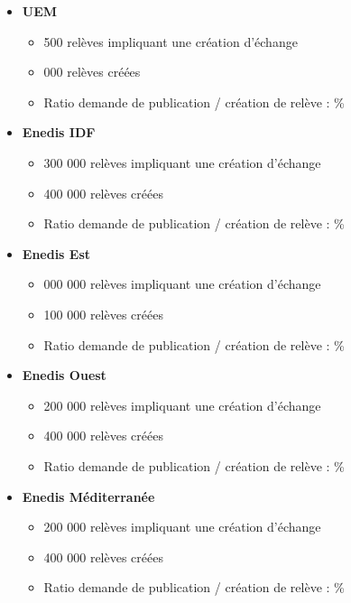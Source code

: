 \documentclass[a4paper, 12pt]{report}
\begin{document}
\begin{itemize}
  \item \textbf{UEM}
  \begin{itemize}
    \item \approx{} 500 relèves impliquant une création d'échange
    \item \approx{} 000 relèves créées
    \item Ratio demande de publication / création de relève : \approx{}\%
  \end{itemize}
  \item \textbf{Enedis IDF}
  \begin{itemize}
    \item \approx{} 300 000 relèves impliquant une création d'échange
    \item \approx{} 400 000 relèves créées
    \item Ratio demande de publication / création de relève : \approx{}\%
  \end{itemize}
  \item \textbf{Enedis Est}
  \begin{itemize}
    \item \approx{} 000 000 relèves impliquant une création d'échange
    \item \approx{} 100 000 relèves créées
    \item Ratio demande de publication / création de relève : \approx{}\%
  \end{itemize}
  \item \textbf{Enedis Ouest}
  \begin{itemize}
    \item \approx{} 200 000 relèves impliquant une création d'échange
    \item \approx{} 400 000 relèves créées
    \item Ratio demande de publication / création de relève : \approx{}\%
  \end{itemize}
  \item \textbf{Enedis Méditerranée}
  \begin{itemize}
    \item \approx{} 200 000 relèves impliquant une création d'échange
    \item \approx{} 400 000 relèves créées
    \item Ratio demande de publication / création de relève : \approx{}\%
  \end{itemize}
\end{itemize}
\vspace{0.6cm}
\end{document}
